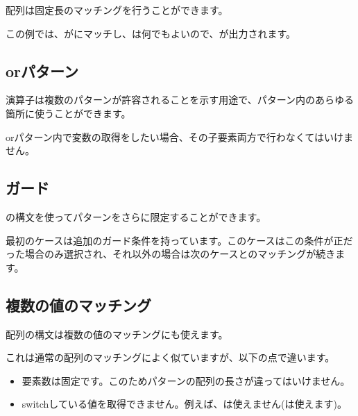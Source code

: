 配列は固定長のマッチングを行うことができます。


この例では、がにマッチし、は何でもよいので、が出力されます。

\subsection{orパターン}
\label{lf-pattern-matching-or}

\expr{|}演算子は複数のパターンが許容されることを示す用途で、パターン内のあらゆる箇所に使うことができます。


orパターン内で変数の取得をしたい場合、その子要素両方で行わなくてはいけません。

\subsection{ガード}
\label{lf-pattern-matching-guards}

の構文を使ってパターンをさらに限定することができます。


最初のケースは追加のガード条件を持っています。このケースはこの条件が正だった場合のみ選択され、それ以外の場合は次のケースとのマッチングが続きます。

\subsection{複数の値のマッチング}
\label{lf-pattern-matching-tuples}

配列の構文は複数の値のマッチングにも使えます。


これは通常の配列のマッチングによく似ていますが、以下の点で違います。

\begin{itemize}
	\item 要素数は固定です。このためパターンの配列の長さが違ってはいけません。
	\item switchしている値を取得できません。例えば、は使えません(は使えます)。
\end{itemize}

